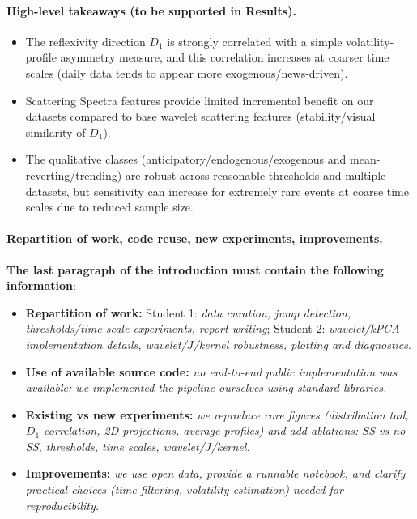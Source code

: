 \documentclass[11pt]{article}
\begin{document}
\paragraph{High-level takeaways (to be supported in Results).}
\begin{itemize}
    \item The reflexivity direction $D_1$ is strongly correlated with a simple volatility-profile asymmetry measure, and this correlation increases at coarser time scales (daily data tends to appear more exogenous/news-driven). 
    \item Scattering Spectra features provide limited incremental benefit on our datasets compared to base wavelet scattering features (stability/visual similarity of $D_1$).
    \item The qualitative classes (anticipatory/endogenous/exogenous and mean-reverting/trending) are robust across reasonable thresholds and multiple datasets, but sensitivity can increase for extremely rare events at coarse time scales due to reduced sample size.
\end{itemize}

\paragraph{Repartition of work, code reuse, new experiments, improvements.}
\textbf{The last paragraph of the introduction must contain the following information}:
\begin{itemize}
    \item \textbf{Repartition of work:} Student 1: \textit{data curation, jump detection, thresholds/time scale experiments, report writing}; Student 2: \textit{wavelet/kPCA implementation details, wavelet/$J$/kernel robustness, plotting and diagnostics}. 
    \item \textbf{Use of available source code:} \textit{no end-to-end public implementation was available; we implemented the pipeline ourselves using standard libraries.} 
    \item \textbf{Existing vs new experiments:} \textit{we reproduce core figures (distribution tail, $D_1$ correlation, 2D projections, average profiles) and add ablations: SS vs no-SS, thresholds, time scales, wavelet/$J$/kernel.}
    \item \textbf{Improvements:} \textit{we use open data, provide a runnable notebook, and clarify practical choices (time filtering, volatility estimation) needed for reproducibility.}
\end{itemize}
\end{document}
